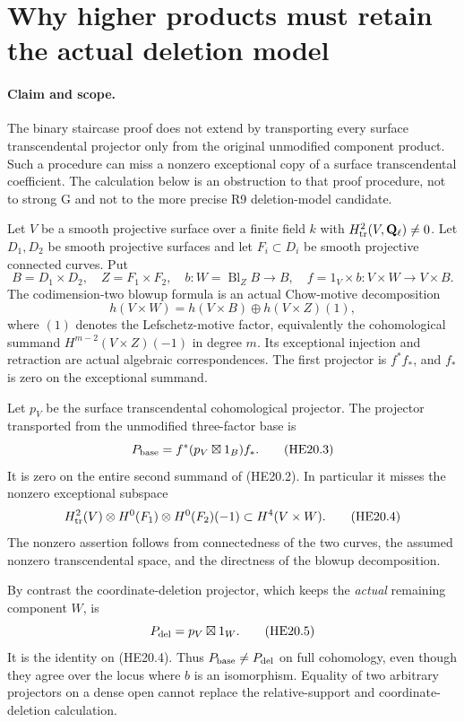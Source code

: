 \section{Why higher products must retain the actual deletion model}
\label{r20he:section}

\paragraph{Claim and scope.}
The binary staircase proof does not extend by transporting every
surface transcendental projector only from the original unmodified
component product. Such a procedure can miss a nonzero exceptional
copy of a surface transcendental coefficient. The calculation below
is an obstruction to that proof procedure, not to strong G and not
to the more precise R9 deletion-model candidate.

Let $V$ be a smooth projective surface over a finite field $k$ with
$H^2_{\rm tr}(V,\mathbf Q_\ell)\ne0$. Let $D_1,D_2$ be smooth
projective surfaces and let $F_i\subset D_i$ be smooth projective
connected curves. Put
\[
 B=D_1\times D_2,\quad Z=F_1\times F_2,\quad
 b:W=\operatorname{Bl}_Z B\longrightarrow B,
 \quad f=1_V\times b:V\times W\longrightarrow V\times B.
 \tag{HE20.1}
\]
The codimension-two blowup formula is an actual Chow-motive
decomposition
\[
 h(V\times W)=h(V\times B)\oplus h(V\times Z)(1),
 \tag{HE20.2}
\]
where $(1)$ denotes the Lefschetz-motive factor, equivalently
the cohomological summand $H^{m-2}(V\times Z)(-1)$ in degree $m$.
Its exceptional injection and retraction are actual algebraic
correspondences. The first projector is $f^*f_*$, and $f_*$ is
zero on the exceptional summand.

Let $p_V$ be the surface transcendental cohomological projector.
The projector transported from the unmodified three-factor base is
\[
              P_{\rm base}=f^*(p_V\boxtimes1_B)f_*.
 \tag{HE20.3}
\]
It is zero on the entire second summand of (HE20.2). In particular
it misses the nonzero exceptional subspace
\[
 H^2_{\rm tr}(V)\otimes H^0(F_1)\otimes H^0(F_2)(-1)
                 \subset H^4(V\times W).
 \tag{HE20.4}
\]
The nonzero assertion follows from connectedness of the two curves,
the assumed nonzero transcendental space, and the directness of
the blowup decomposition.

By contrast the coordinate-deletion projector, which keeps the
\emph{actual} remaining component $W$, is
\[
                        P_{\rm del}=p_V\boxtimes1_W.
 \tag{HE20.5}
\]
It is the identity on (HE20.4). Thus
$P_{\rm base}\ne P_{\rm del}$ on full cohomology, even though
they agree over the locus where $b$ is an isomorphism. Equality
of two arbitrary projectors on a dense open cannot replace the
relative-support and coordinate-deletion calculation.


